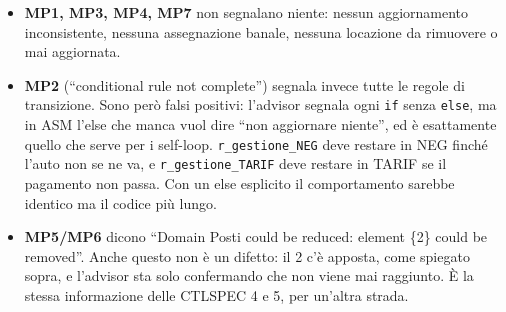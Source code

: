 \begin{itemize}
\item \textbf{MP1, MP3, MP4, MP7} non segnalano niente: nessun aggiornamento
inconsistente, nessuna assegnazione banale, nessuna locazione da rimuovere o mai
aggiornata.

\item \textbf{MP2} (``conditional rule not complete'') segnala invece tutte le regole di
transizione. Sono però falsi positivi: l'advisor segnala ogni \texttt{if} senza
\texttt{else}, ma in ASM l'else che manca vuol dire ``non aggiornare niente'', ed è
esattamente quello che serve per i self-loop.
\texttt{r\_gestione\_NEG} deve restare in NEG finché l'auto non se ne va, e
\texttt{r\_gestione\_TARIF} deve restare in TARIF se il pagamento non passa. Con un else esplicito il comportamento sarebbe identico ma il codice più lungo.

\item \textbf{MP5/MP6} dicono ``Domain Posti could be reduced: element \{2\} could be
removed''. Anche questo non è un difetto: il 2 c'è apposta, come spiegato sopra, e
l'advisor sta solo confermando che non viene mai raggiunto. È la stessa informazione
delle CTLSPEC 4 e 5, per un'altra strada.
\end{itemize}


\newpage